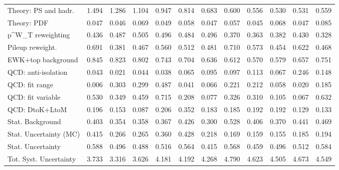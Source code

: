 \begin{tabular}{l|p{0.6cm}p{0.6cm}p{0.6cm}p{0.6cm}p{0.6cm}p{0.6cm}p{0.6cm}p{0.6cm}p{0.6cm}p{0.6cm}p{0.6cm}}
Theory: PS and hadr.                     & 1.494 & 1.286 & 1.104 & 0.947 & 0.814 & 0.683 & 0.600 & 0.556 & 0.530 & 0.531 & 0.559 \\
Theory: PDF                              & 0.047 & 0.046 & 0.069 & 0.049 & 0.058 & 0.047 & 0.057 & 0.045 & 0.068 & 0.047 & 0.085 \\
p^{W}_{T} reweighting                    & 0.436 & 0.487 & 0.505 & 0.496 & 0.484 & 0.496 & 0.370 & 0.363 & 0.382 & 0.430 & 0.328 \\
Pileup reweight.                         & 0.691 & 0.381 & 0.467 & 0.560 & 0.512 & 0.481 & 0.710 & 0.573 & 0.454 & 0.622 & 0.468 \\
EWK+top background                       & 0.845 & 0.823 & 0.802 & 0.743 & 0.704 & 0.636 & 0.612 & 0.570 & 0.579 & 0.657 & 0.751 \\
QCD: anti-isolation                      & 0.043 & 0.021 & 0.044 & 0.038 & 0.065 & 0.095 & 0.097 & 0.113 & 0.067 & 0.246 & 0.148 \\
QCD: fit range                           & 0.006 & 0.303 & 0.299 & 0.487 & 0.041 & 0.066 & 0.221 & 0.212 & 0.058 & 0.020 & 0.185 \\
QCD: fit variable                        & 0.530 & 0.349 & 0.459 & 0.715 & 0.208 & 0.077 & 0.326 & 0.310 & 0.105 & 0.067 & 0.632 \\
QCD: DtoK+LtoM                           & 0.196 & 0.153 & 0.087 & 0.206 & 0.352 & 0.183 & 0.185 & 0.192 & 0.192 & 0.129 & 0.133 \\
Stat. Background                         & 0.403 & 0.354 & 0.358 & 0.367 & 0.426 & 0.300 & 0.528 & 0.406 & 0.370 & 0.441 & 0.469 \\
Stat. Uncertainty (MC)                   & 0.415 & 0.266 & 0.265 & 0.360 & 0.428 & 0.218 & 0.169 & 0.159 & 0.155 & 0.185 & 0.194 \\
\hline
Stat. Uncertainty                        & 0.588 & 0.496 & 0.488 & 0.516 & 0.564 & 0.415 & 0.568 & 0.459 & 0.496 & 0.512 & 0.584 \\
\hline
Tot. Syst. Uncertainty                   & 3.733 & 3.316 & 3.626 & 4.181 & 4.192 & 4.268 & 4.790 & 4.623 & 4.505 & 4.673 & 4.549 \\
\hline
\end{tabular}
